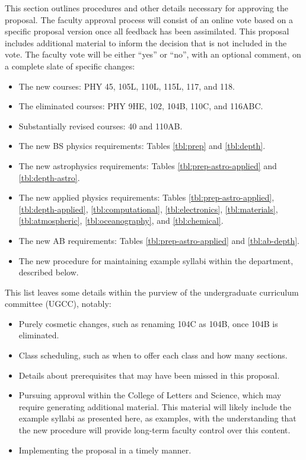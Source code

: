 \documentclass[12pt]{article}
\begin{document}
This section outlines procedures and other details necessary for
approving the proposal.  The faculty approval process will consist of
an online vote based on a specific proposal version once all feedback
has been assimilated.  This proposal includes additional material to
inform the decision that is not included in the vote.  The faculty
vote will be either ``yes'' or ``no'', with an optional comment, on a
complete slate of specific changes:
\begin{itemize}
 \item The new courses: PHY 45, 105L, 110L, 115L, 117, and 118.
 \item The eliminated courses:  PHY 9HE, 102, 104B, 110C, and 116ABC.
 \item Substantially revised courses: 40 and 110AB.
 \item The new BS physics requirements: Tables \ref{tbl:prep} and \ref{tbl:depth}.
 \item The new astrophysics requirements: Tables \ref{tbl:prep-astro-applied} and \ref{tbl:depth-astro}.   
 \item The new applied physics requirements: Tables \ref{tbl:prep-astro-applied}, \ref{tbl:depth-applied},
\ref{tbl:computational}, \ref{tbl:electronics}, \ref{tbl:materials}, \ref{tbl:atmospheric}, \ref{tbl:oceanography}, and \ref{tbl:chemical}.   
 \item The new AB requirements: Tables \ref{tbl:prep-astro-applied} and \ref{tbl:ab-depth}.
 \item The new procedure for maintaining example syllabi within the department, described below.
\end{itemize}
This list leaves some details within the purview of the undergraduate
curriculum committee (UGCC), notably:
\begin{itemize}
 \item Purely cosmetic changes, such as renaming 104C as 104B, once 104B is eliminated.
 \item Class scheduling, such as when to offer each class and how many sections.
 \item Details about prerequisites that may have been missed in this proposal.
 \item Pursuing approval within the College of Letters and Science, which may require
   generating additional material.  This material will likely include
   the example syllabi as presented here, as examples, with the
   understanding that the new procedure will provide long-term faculty
   control over this content.
 \item Implementing the proposal in a timely manner.
\end{itemize}
\end{document}
